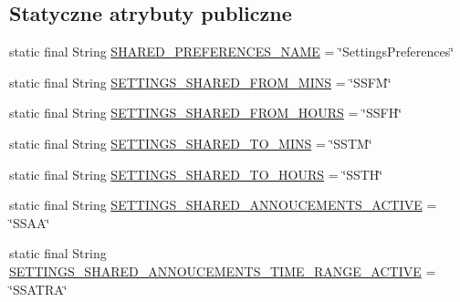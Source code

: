 \subsection*{Statyczne atrybuty publiczne}
\begin{DoxyCompactItemize}
\item 
static final String \hyperlink{classpl_1_1edu_1_1uwb_1_1mobiuwb_1_1view_1_1settings_1_1_settings_preferences_manager_af0cac7efad9591dab402f6a4f40baa18}{S\+H\+A\+R\+E\+D\+\_\+\+P\+R\+E\+F\+E\+R\+E\+N\+C\+E\+S\+\_\+\+N\+A\+M\+E} = \char`\"{}Settings\+Preferences\char`\"{}
\item 
static final String \hyperlink{classpl_1_1edu_1_1uwb_1_1mobiuwb_1_1view_1_1settings_1_1_settings_preferences_manager_aaf3298366f49558101e937c30d690398}{S\+E\+T\+T\+I\+N\+G\+S\+\_\+\+S\+H\+A\+R\+E\+D\+\_\+\+F\+R\+O\+M\+\_\+\+M\+I\+N\+S} = \char`\"{}S\+S\+F\+M\char`\"{}
\item 
static final String \hyperlink{classpl_1_1edu_1_1uwb_1_1mobiuwb_1_1view_1_1settings_1_1_settings_preferences_manager_aff12c1af75c66775eab62ebe2975ebf4}{S\+E\+T\+T\+I\+N\+G\+S\+\_\+\+S\+H\+A\+R\+E\+D\+\_\+\+F\+R\+O\+M\+\_\+\+H\+O\+U\+R\+S} = \char`\"{}S\+S\+F\+H\char`\"{}
\item 
static final String \hyperlink{classpl_1_1edu_1_1uwb_1_1mobiuwb_1_1view_1_1settings_1_1_settings_preferences_manager_aac08fe062bb7b7453b578cea7db516a4}{S\+E\+T\+T\+I\+N\+G\+S\+\_\+\+S\+H\+A\+R\+E\+D\+\_\+\+T\+O\+\_\+\+M\+I\+N\+S} = \char`\"{}S\+S\+T\+M\char`\"{}
\item 
static final String \hyperlink{classpl_1_1edu_1_1uwb_1_1mobiuwb_1_1view_1_1settings_1_1_settings_preferences_manager_ad99bea2aaf3cc39a105a99abb324ba00}{S\+E\+T\+T\+I\+N\+G\+S\+\_\+\+S\+H\+A\+R\+E\+D\+\_\+\+T\+O\+\_\+\+H\+O\+U\+R\+S} = \char`\"{}S\+S\+T\+H\char`\"{}
\item 
static final String \hyperlink{classpl_1_1edu_1_1uwb_1_1mobiuwb_1_1view_1_1settings_1_1_settings_preferences_manager_a00f562773aa382c7029bacf6e29a9af4}{S\+E\+T\+T\+I\+N\+G\+S\+\_\+\+S\+H\+A\+R\+E\+D\+\_\+\+A\+N\+N\+O\+U\+C\+E\+M\+E\+N\+T\+S\+\_\+\+A\+C\+T\+I\+V\+E} = \char`\"{}S\+S\+A\+A\char`\"{}
\item 
static final String \hyperlink{classpl_1_1edu_1_1uwb_1_1mobiuwb_1_1view_1_1settings_1_1_settings_preferences_manager_a5148c9c03e8fa1de2b0c90050f697583}{S\+E\+T\+T\+I\+N\+G\+S\+\_\+\+S\+H\+A\+R\+E\+D\+\_\+\+A\+N\+N\+O\+U\+C\+E\+M\+E\+N\+T\+S\+\_\+\+T\+I\+M\+E\+\_\+\+R\+A\+N\+G\+E\+\_\+\+A\+C\+T\+I\+V\+E} = \char`\"{}S\+S\+A\+T\+R\+A\char`\"{}
\item 

\end{DoxyCompactItemize}
